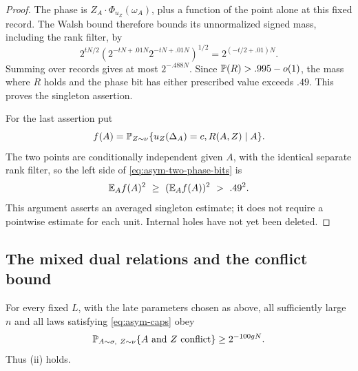 \begin{proof}
The phase is \(Z_A\cdot\Phi_{u_Z}(\omega_A)\), plus a
function of the point alone at this fixed record.  The Walsh
bound  therefore bounds its unnormalized signed
mass, including the rank filter, by
\[
 2^{tN/2}
 \left(2^{-tN+.01N}2^{-tN+.01N}\right)^{1/2}
 =2^{(-t/2+.01)N}.
\]
Summing over records gives at most \(2^{-.488N}\).  Since
\(\mathbb P(R)> .995-o(1)\), the mass where \(R\) holds and
the phase bit has either prescribed value exceeds \(.49\).
This proves the singleton assertion.

For the last assertion put
\[
 f(A)=\mathbb P_{Z\sim\nu}\{u_Z(\Delta_A)=c, R(A,Z)\mid A\}.
\]
The two points are conditionally independent given \(A\), with
the identical separate rank filter, so the left side of
\eqref{eq:asym-two-phase-bits} is
\[
 \E_A f(A)^2\ \ge\ (\E_A f(A))^2\ >\ .49^2.
\]
This argument asserts an averaged singleton estimate; it does
not require a pointwise estimate for each unit.  Internal holes
have not yet been deleted.
\end{proof}

\subsection{The mixed dual relations and the conflict bound}

\begin{proposition}
\label{prop:asymmetric-distribution}
For every fixed \(L\), with the late parameters chosen as above,
all sufficiently large \(n\) and all laws satisfying
\eqref{eq:asym-caps} obey
\[
 \mathbb P_{A\sim\sigma,\ Z\sim\nu}
       \{A\text{ and }Z\text{ conflict}\}\ge2^{-100gN}.
\]
Thus \textup{(ii)} holds.
\end{proposition}

